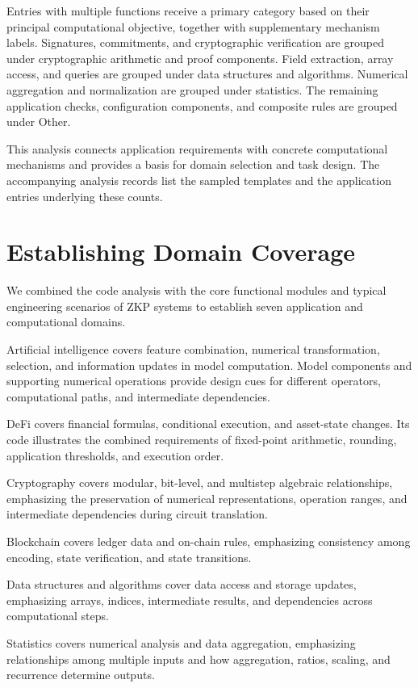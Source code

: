 \documentclass[11pt,a4paper]{article}
\begin{document}
Entries with multiple functions receive a primary category based on their principal computational objective, together with supplementary mechanism labels. Signatures, commitments, and cryptographic verification are grouped under cryptographic arithmetic and proof components. Field extraction, array access, and queries are grouped under data structures and algorithms. Numerical aggregation and normalization are grouped under statistics. The remaining application checks, configuration components, and composite rules are grouped under Other.

This analysis connects application requirements with concrete computational mechanisms and provides a basis for domain selection and task design. The accompanying analysis records list the sampled templates and the application entries underlying these counts.

\section{Establishing Domain Coverage}

We combined the code analysis with the core functional modules and typical engineering scenarios of ZKP systems to establish seven application and computational domains.

Artificial intelligence covers feature combination, numerical transformation, selection, and information updates in model computation. Model components and supporting numerical operations provide design cues for different operators, computational paths, and intermediate dependencies.

DeFi covers financial formulas, conditional execution, and asset-state changes. Its code illustrates the combined requirements of fixed-point arithmetic, rounding, application thresholds, and execution order.

Cryptography covers modular, bit-level, and multistep algebraic relationships, emphasizing the preservation of numerical representations, operation ranges, and intermediate dependencies during circuit translation.

Blockchain covers ledger data and on-chain rules, emphasizing consistency among encoding, state verification, and state transitions.

Data structures and algorithms cover data access and storage updates, emphasizing arrays, indices, intermediate results, and dependencies across computational steps.

Statistics covers numerical analysis and data aggregation, emphasizing relationships among multiple inputs and how aggregation, ratios, scaling, and recurrence determine outputs.
\end{document}
